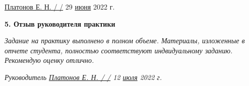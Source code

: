 \vspace{20pt}

\underline{Платонов Е. Н. / \hspace{3cm} /} 29 \underline{июня} 2022 г.

\vspace{10pt}
\pagebreak

\textbf{5. Отзыв руководителя практики}

{\em Задание на практику выполнено в полном объеме. Материалы, изложенные в отчете студента, полностью соответствуют индвидуальному заданию. Рекомендую оценку отлично. }

\vspace{30pt}

{\em Руководитель \hspace{3cm} \underline{ Платонов Е. Н. / \hspace{3cm} /} 12 \underline{июля} 2022 г.}
\pagebreak
